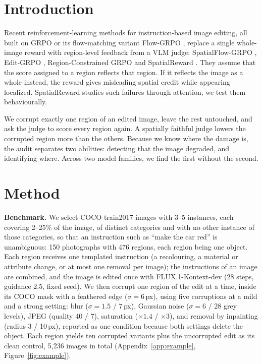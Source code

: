 \documentclass[10pt,a4paper]{article}
\begin{document}

\section{Introduction}

Recent reinforcement-learning methods for instruction-based image editing, all built on GRPO \cite{shao2024deepseekmath} or its flow-matching variant Flow-GRPO \cite{liu2025flowgrpo}, replace a single whole-image reward with region-level feedback from a VLM judge: SpatialFlow-GRPO \cite{yang2026spatialflow}, Edit-GRPO \cite{xu2026editgrpo}, Region-Constrained GRPO \cite{ouyang2026rcgrpo} and SpatialReward \cite{long2026spatialreward}. They assume that the score assigned to a region reflects that region. If it reflects the image as a whole instead, the reward gives misleading spatial credit while appearing localized. SpatialReward studies such failures through attention, we test them behaviourally.

We corrupt exactly one region of an edited image, leave the rest untouched, and ask the judge to score every region again. A spatially faithful judge lowers the corrupted region more than the others. Because we know where the damage is, the audit separates two abilities: detecting that the image degraded, and identifying where. Across two model families, we find the first without the second.


\section{Method}

\textbf{Benchmark.} We select COCO train2017 images \cite{lin2014coco} with 3--5 instances, each covering 2--25\% of the image, of distinct categories and with no other instance of those categories, so that an instruction such as ``make the car red'' is unambiguous: 150 photographs with 476 regions, each region being one object. Each region receives one templated instruction (a recolouring, a material or attribute change, or at most one removal per image); the instructions of an image are combined, and the image is edited once with FLUX.1-Kontext-dev \cite{bfl2025kontext} (28 steps, guidance 2.5, fixed seed). We then corrupt one region of the edit at a time, inside its COCO mask with a feathered edge ($\sigma=6$\,px), using five corruptions at a mild and a strong setting: blur ($\sigma=1.5$ / $7$\,px), Gaussian noise ($\sigma=6$ / $28$ grey levels), JPEG (quality 40 / 7), saturation ($\times1.4$ / $\times3$), and removal by inpainting \cite{telea2004inpainting} (radius 3 / 10\,px), reported as one condition because both settings delete the object. Each region yields ten corrupted variants plus the uncorrupted edit as its clean control, 5,236 images in total (Appendix~\ref{app:example}, Figure~\ref{fig:example}).
\end{document}

